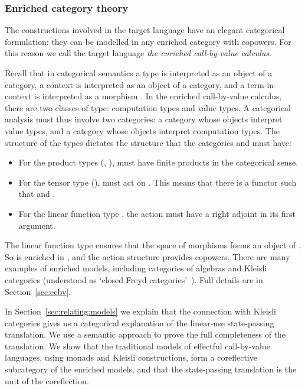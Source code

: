 \documentclass{LMCS}
\newcommand{\hide}[1]{}
\begin{document}
\subsubsection*{Enriched category theory}
The constructions involved in the target language
have an elegant categorical formulation:
they can be modelled in any enriched 
category with copowers. For this reason we call 
the target language \emph{the enriched call-by-value calculus}.

Recall that in categorical semantics
a type  is interpreted as an object  of a category,
a context  
is interpreted as an object  of a category,
and a term-in-context  is interpreted
as a morphism .
In the enriched call-by-value calculus,
there are two classes of type: computation types and value types.
A categorical analysis must thus involve two categories:
a category  whose objects interpret value types,
and a category  whose objects interpret computation types.
The structure of the types dictates the  
structure that the categories  and  must have:
\begin{itemize}
\item For the product types (, ),  must have
finite products in the categorical sense.
\item For the tensor type (),
 must act on . This means that there is a functor
 such that
 and 
.
\item For the linear function type ,
the action  must have a right adjoint in
its first argument.
\end{itemize}
The linear function type  ensures that the 
space of 
morphisms  forms an object of .
So  is enriched in , and the action structure
provides copowers.
There are many examples of enriched models, including 
categories of algebras and Kleisli categories
(understood as `closed Freyd categories'~\cite{Levy:03}). 
Full details are in Section~\ref{sec:ecbv}. 

In Section~\ref{sec:relating:models} we explain that
the connection with Kleisli categories gives us a categorical 
explanation of the linear-use state-passing translation.
We use a semantic 
approach to prove the full completeness 
of the translation.
We show that the
traditional models of effectful call-by-value languages, using monads
and Kleisli constructions, form a coreflective subcategory 
of the enriched models, and that the state-passing translation is the
unit of the coreflection.  
\hide{Our main semantic result provides a
bijective correspondence between comodel structures on a state object
and model structures on the induced linear state monad. This extends
Plotkin and Power's correspondence between algebraic operations and
generic effects~\cite{Plotkin:Power:03} with a third component: state access operations.}
\end{document}
